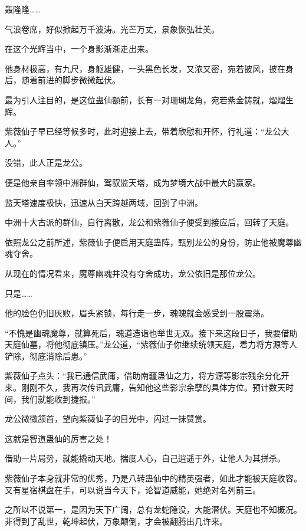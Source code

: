 
\begin{this_body}



轰隆隆……

气浪卷席，好似掀起万千波涛。光芒万丈，景象恢弘壮美。

在这个光辉当中，一个身影渐渐走出来。

他身材极高，有九尺，身躯雄健，一头黑色长发，又浓又密，宛若披风，披在身后，随着前进的脚步微微起伏。

最为引人注目的，是这位蛊仙额前，长有一对珊瑚龙角，宛若紫金铸就，熠熠生辉。

紫薇仙子早已经等候多时，此时迎接上去，带着欣慰和开怀，行礼道：“龙公大人。”

没错，此人正是龙公。

便是他亲自率领中洲群仙，驾驭监天塔，成为梦境大战中最大的赢家。

监天塔速度极快，迅速从白天跨越两域，回到了中洲。

中洲十大古派的群仙，自行离散，龙公和紫薇仙子便受到接应后，回转了天庭。

依照龙公之前所述，紫薇仙子便启用天庭蛊阵，甄别龙公的身份，防止他被魔尊幽魂夺舍。

从现在的情况看来，魔尊幽魂并没有夺舍成功，龙公依旧是那位龙公。

只是……

他的脸色仍旧灰败，眉头紧锁，每行走一步，魂魄就会感受到一股震荡。

“不愧是幽魂魔尊，就算死后，魂道造诣也举世无双。接下来这段日子，我要借助天庭仙墓，将他彻底镇压。”龙公道，“紫薇仙子你继续统领天庭，着力将方源等人铲除，彻底消除后患。”

紫薇仙子点头：“我已通信武庸，借助南疆蛊仙之力，将方源等影宗残余分化开来。刚刚不久，我再次传讯武庸，告知他这些影宗余孽的具体方位。预计数天时间，我们就能收到捷报。”

龙公微微颔首，望向紫薇仙子的目光中，闪过一抹赞赏。

这就是智道蛊仙的厉害之处！

借助一片局势，就能撬动天地。揣度人心，自己逍遥于外，让他人为其拼杀。

紫薇仙子本身就非常的优秀，乃是八转蛊仙中的精英强者，如此才能被天庭收容。又有星宿棋盘在手，可以说当今天下，论智道威能，她绝对名列前三。

之所以不说第一，是因为天下广阔，总有龙蛇隐没，大能潜伏。天庭也不知概况。非得到了乱世，乾坤起伏，万象颠倒，才会被翻腾出几许来。


\end{this_body}
